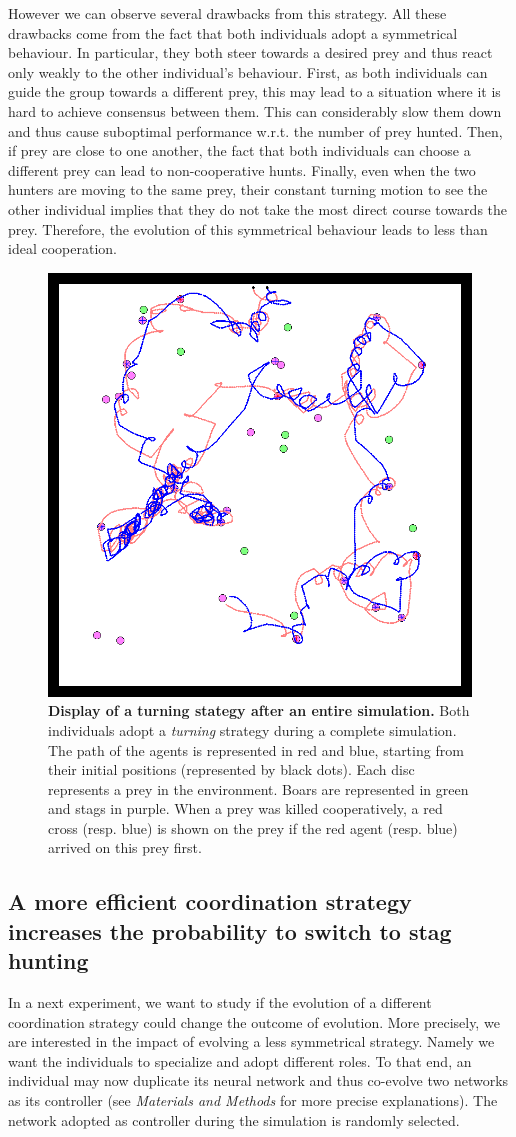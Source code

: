     However we can observe several drawbacks from this strategy. All these drawbacks come from the fact that both individuals adopt a symmetrical behaviour. In particular, they both steer towards a desired prey and thus react only weakly to the other individual's behaviour. First, as both individuals can guide the group towards a different prey, this may lead to a situation where it is hard to achieve consensus between them. This can considerably slow them down and thus cause suboptimal performance w.r.t. the number of prey hunted. Then, if prey are close to one another, the fact that both individuals can choose a different prey can lead to non-cooperative hunts. Finally, even when the two hunters are moving to the same prey, their constant turning motion to see the other individual implies that they do not take the most direct course towards the prey. Therefore, the evolution of this symmetrical behaviour leads to less than ideal cooperation.

    \begin{figure}[h]
      \centering
        \includegraphics[width=0.5\linewidth]{fig/ArticleBio2/Fig3.png}
        \caption{\textbf{Display of a turning stategy after an entire simulation.}
        Both individuals adopt a \emph{turning} strategy during a complete simulation. The path of the agents is represented in red and blue, starting from their initial positions (represented by black dots). Each disc represents a prey in the environment. Boars are represented in green and stags in purple. When a prey was killed cooperatively, a red cross (resp. blue) is shown on the prey if the red agent (resp. blue) arrived on this prey first.}
      \label{fig:figTurningBehaviour}
    \end{figure}


  \subsection{A more efficient coordination strategy increases the probability to switch to stag hunting}
    In a next experiment, we want to study if the evolution of a different coordination strategy could change the outcome of evolution. More precisely, we are interested in the impact of evolving a less symmetrical strategy. Namely we want the individuals to specialize and adopt different roles. To that end, an individual may now duplicate its neural network and thus co-evolve two networks as its controller (see \emph{Materials and Methods} for more precise explanations). The network adopted as controller during the simulation is randomly selected.

